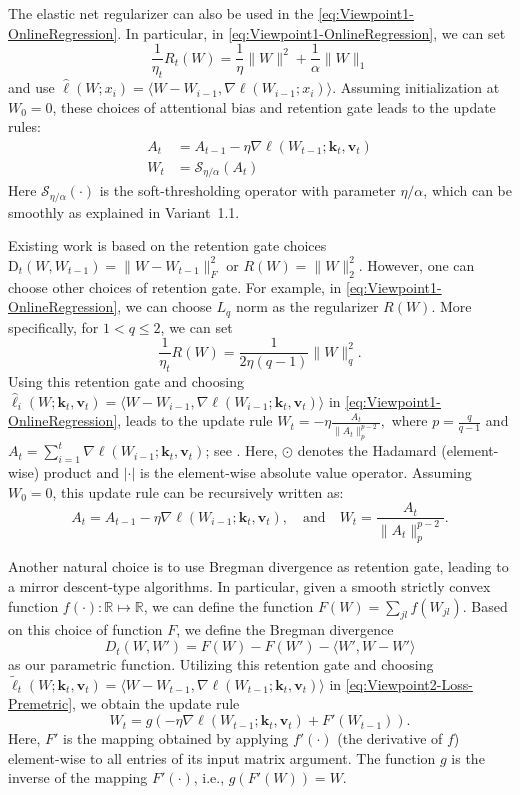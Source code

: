 \documentclass{article}
\newcommand{\vk}[0]{\mathbf{k}}
\newcommand{\vvv}[0]{\mathbf{v}}
\theoremstyle{plain}
\theoremstyle{definition}
\theoremstyle{remark}
\newcommand{\head}[1]{\vspace{1.7mm}\noindent{{\textcolor{c2}{\bf #1.}}}}
\begin{document}
\head{Variant 3: Elastic Net Regularization: Forgetting via Soft-thresholding} The elastic net regularizer can also be used in the \eqref{eq:Viewpoint1-OnlineRegression}. In particular, in \eqref{eq:Viewpoint1-OnlineRegression}, we can set
\[
\frac{1}{\eta_t}R_t(W) = \frac{1}{\eta} \|W\|^2 + \frac{1}{\alpha} \|W\|_1
\]
and use $\widehat{\ell}(W;x_i) = \langle W-W_{i-1}, \nabla \ell(W_{i-1};x_i)\rangle$. Assuming initialization at $W_0 = 0$, these choices of attentional bias and retention gate leads to the update rules:
\begin{align}
    A_t &= A_{t-1} - \eta \nabla \ell(W_{t-1};\vk_t, \vvv_t) \nonumber\\
    W_t &= \mathcal{S}_{\eta/\alpha} \left(A_t\right)
\end{align}
Here $\mathcal{S}_{\eta/\alpha} (\cdot)$ is the soft-thresholding operator with parameter $\eta/\alpha$, which can be smoothly as explained in Variant~1.1.

\head{Variant 4: General $L_q$ Memory Stability} Existing work is based on the retention gate choices $\mbox{D}_t(W,W_{t-1}) = \|W-W_{t-1}\|^2_F$ or $R(W) = \|W\|_2^2$. However, one can choose other choices of retention gate. For example, in \eqref{eq:Viewpoint1-OnlineRegression}, we can choose $L_q$ norm as the regularizer $R(W)$. More specifically, for $1<q\leq 2$, we can set 
\[
\frac{1}{\eta_t}R(W) = \frac{1}{2\eta (q-1)} \|W\|_q^2.
\]
Using this retention gate and choosing $\widehat{\ell}_i(W;\vk_t, \vvv_t) = \langle W-W_{i-1} , \nabla \ell(W_{i-1};\vk_t, \vvv_t)  \rangle$ in \eqref{eq:Viewpoint1-OnlineRegression},  leads to the update rule
$
W_t = - \eta \frac{A_t}{\|A_t\|_p^{p-2}},
$
where $p = \frac{q}{q-1}$ and $A_t = \sum_{i=1}^t\nabla \ell(W_{i-1};\vk_t, \vvv_t)$; see \cite[Section 2.6]{shalev2012online}. Here, $\odot$ denotes the Hadamard (element-wise) product and $|\cdot|$ is the element-wise absolute value operator.  Assuming $W_0 =0$, this update rule can be recursively written as:
\[
A_t = A_{t-1} - \eta \nabla \ell(W_{i-1};\vk_t, \vvv_t),
\quad
\textrm{and}
\quad
W_t = \frac{A_t}{\|A_t\|_p^{p-2}}.
\]

\head{Variant 5:  Bregman Divergence as Retention Gate.} Another natural choice is to use Bregman divergence as retention gate, leading to a mirror descent-type algorithms. In particular, given a smooth strictly convex function $f(\cdot):\mathbb{R} \mapsto \mathbb{R}$, we can define the function $F(W) = \sum_{jl} f(W_{jl})$. Based on this choice of function $F$, we define the Bregman divergence
\[
D_t(W,W') = F(W) - F(W') - \langle W', W-W'\rangle
\]
 as our parametric function. Utilizing this retention gate and choosing $\widetilde{\ell}_t(W;\vk_t, \vvv_t) = \langle W-W_{t-1} , \nabla \ell(W_{t-1};\vk_t, \vvv_t)  \rangle$
 in \eqref{eq:Viewpoint2-Loss-Premetric}, we obtain the update rule 
 \[
 W_t = g\left(-\eta \nabla \ell(W_{t-1};\vk_t, \vvv_t) + F'(W_{t-1})\right).
 \]
Here, $F'$ is the mapping obtained by applying $f'(\cdot)$ (the derivative of $f$) element-wise to all entries of its  input matrix argument. The function $g$ is the inverse of the mapping $F'(\cdot)$, i.e., $g(F'(W)) = W$. 
\end{document}
